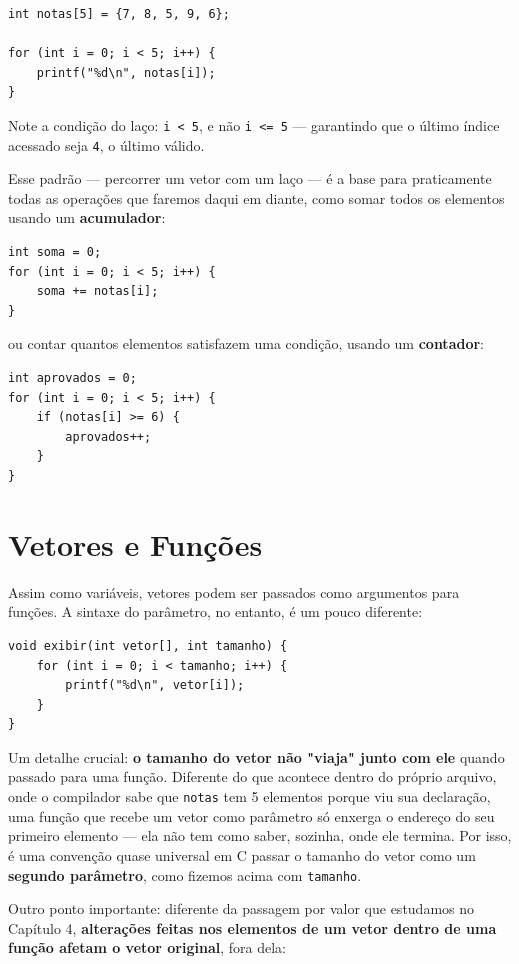 \documentclass[12pt,a4paper,oneside]{extreport}
\begin{document}
\begin{lstlisting}
int notas[5] = {7, 8, 5, 9, 6};

for (int i = 0; i < 5; i++) {
    printf("%d\n", notas[i]);
}
\end{lstlisting}

Note a condição do laço: \texttt{i < 5}, e não \texttt{i <= 5} — garantindo que o último índice acessado seja \texttt{4}, o último válido.

Esse padrão — percorrer um vetor com um laço — é a base para praticamente todas as operações que faremos daqui em diante, como somar todos os elementos usando um \textbf{acumulador}:

\begin{lstlisting}
int soma = 0;
for (int i = 0; i < 5; i++) {
    soma += notas[i];
}
\end{lstlisting}

ou contar quantos elementos satisfazem uma condição, usando um \textbf{contador}:

\begin{lstlisting}
int aprovados = 0;
for (int i = 0; i < 5; i++) {
    if (notas[i] >= 6) {
        aprovados++;
    }
}
\end{lstlisting}

\section{Vetores e Funções}

Assim como variáveis, vetores podem ser passados como argumentos para funções. A sintaxe do parâmetro, no entanto, é um pouco diferente:

\begin{lstlisting}
void exibir(int vetor[], int tamanho) {
    for (int i = 0; i < tamanho; i++) {
        printf("%d\n", vetor[i]);
    }
}
\end{lstlisting}

Um detalhe crucial: \textbf{o tamanho do vetor não "viaja" junto com ele} quando passado para uma função. Diferente do que acontece dentro do próprio arquivo, onde o compilador sabe que \texttt{notas} tem 5 elementos porque viu sua declaração, uma função que recebe um vetor como parâmetro só enxerga o endereço do seu primeiro elemento — ela não tem como saber, sozinha, onde ele termina. Por isso, é uma convenção quase universal em C passar o tamanho do vetor como um \textbf{segundo parâmetro}, como fizemos acima com \texttt{tamanho}.

Outro ponto importante: diferente da passagem por valor que estudamos no Capítulo 4, \textbf{alterações feitas nos elementos de um vetor dentro de uma função afetam o vetor original}, fora dela:
\end{document}
